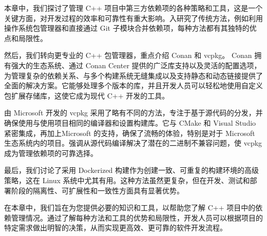本章中，我们探讨了管理 C++ 项目中第三方依赖项的各种策略和工具，这是一个关键方面，对开发过程的效率和可靠性有重大影响。入研究了传统方法，例如利用操作系统包管理器和直接通过 Git 子模块合并依赖项，每种方法都有其独特的优点和局限性。

然后，我们转向更专业的 C++ 包管理器，重点介绍 Conan 和 vcpkg。 Conan 拥有强大的生态系统、通过 Conan Center 提供的广泛库支持以及灵活的配置选项，为管理复杂的依赖关系、与多个构建系统无缝集成以及支持静态和动态链接提供了全面的解决方案。它能够处理多个版本的库，并且开发人员可以轻松地使用自定义包扩展存储库，这使它成为现代 C++ 开发的工具。

由 Microsoft 开发的 vcpkg 采用了略有不同的方法，专注于基于源代码的分发，并确保使用与使用项目相同的编译器和设置构建库。它与 CMake 和 Visual Studio 紧密集成，再加上Microsoft 的支持，确保了流畅的体验，特别是对于 Microsoft 生态系统内的项目。强调从源代码编译解决了潜在的二进制不兼容问题，使 vcpkg 成为管理依赖项的可靠选择。

最后，我们讨论了采用 Dockerized 构建作为创建一致、可重复的构建环境的高级策略，这在 Linux 系统中尤其有用。这种方法虽然更复杂，但在开发、测试和部署阶段的隔离性、可扩展性和一致性方面具有显著优势。

在本章中，我们旨在为您提供必要的知识和工具，以帮助您了解 C++ 项目中的依赖管理情况。通过了解每种方法和工具的优势和局限性，开发人员可以根据项目的特定需求做出明智的决策，从而实现更高效、更可靠的软件开发流程。
